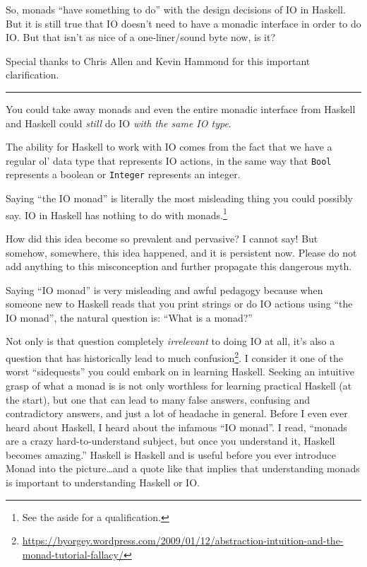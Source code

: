 \documentclass[]{article}
\renewcommand{\href}[2]{#2\footnote{\url{#1}}}
\begin{document}
So, monads ``have something to do'' with the design decisions of IO in
Haskell. But it is still true that IO doesn't need to have a monadic
interface in order to do IO. But that isn't as nice of a one-liner/sound
byte now, is it?

Special thanks to Chris Allen and Kevin Hammond for this important
clarification.

\begin{center}\rule{0.5\linewidth}{\linethickness}\end{center}

You could take away monads and even the entire monadic interface from
Haskell and Haskell could \emph{still} do IO \emph{with the same IO
type}.

The ability for Haskell to work with IO comes from the fact that we have
a regular ol' data type that represents IO actions, in the same way that
\texttt{Bool} represents a boolean or \texttt{Integer} represents an
integer.

Saying ``the IO monad'' is literally the most misleading thing you could
possibly say. IO in Haskell has nothing to do with monads.\footnote{See
  the aside for a qualification.}

How did this idea become so prevalent and pervasive? I cannot say! But
somehow, somewhere, this idea happened, and it is persistent now. Please
do not add anything to this misconception and further propagate this
dangerous myth.

Saying ``IO monad'' is very misleading and awful pedagogy because when
someone new to Haskell reads that you print strings or do IO actions
using ``the IO monad'', the natural question is: ``What is a monad?''

Not only is that question completely \emph{irrelevant} to doing IO at
all, it's also a question that has
\href{https://byorgey.wordpress.com/2009/01/12/abstraction-intuition-and-the-monad-tutorial-fallacy/}{historically
lead to much confusion}. I consider it one of the worst ``sidequests''
you could embark on in learning Haskell. Seeking an intuitive grasp of
what a monad is is not only worthless for learning practical Haskell (at
the start), but one that can lead to many false answers, confusing and
contradictory answers, and just a lot of headache in general. Before I
even ever heard about Haskell, I heard about the infamous ``IO monad''.
I read, ``monads are a crazy hard-to-understand subject, but once you
understand it, Haskell becomes amazing.'' Haskell is Haskell and is
useful before you ever introduce Monad into the picture\ldots{}and a
quote like that implies that understanding monads is important to
understanding Haskell or IO.
\end{document}
